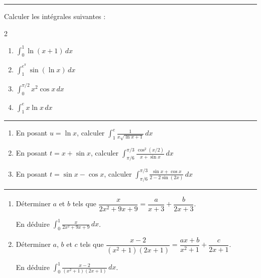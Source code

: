 \documentclass[../PolyS2.tex]{subfiles}
\begin{document}
\vspace{1em}\hrule\vspace{1em}

\newpage 


Calculer les intégrales suivantes :

\begin{multicols}{2}
\begin{enumerate}
\item $\displaystyle\int_0^1 \ln(x+1) \, dx$
\item $\displaystyle\int_1^{e^\pi} \sin(\ln x) \, dx$
\item $\displaystyle\int_0^{\pi/2} x^2 \cos x \, dx$
\item $\displaystyle\int_1^e x \ln x \, dx$
\end{enumerate}
\end{multicols}

\vspace{1em}\hrule\vspace{1em}


\begin{enumerate}
\item En posant $u = \ln x$, calculer $\displaystyle\int_1^e \frac{1}{x\sqrt{\ln x + 1}} \, dx$
\item En posant $t = x + \sin x$, calculer $\displaystyle\int_{\pi/6}^{\pi/3} \frac{\cos^2(x/2)}{x + \sin x} \, dx$
\item En posant $t = \sin x - \cos x$, calculer $\displaystyle\int_{\pi/6}^{\pi/3} \frac{\sin x + \cos x}{2 - 2\sin(2x)} \, dx$
\end{enumerate}

\vspace{1em}\hrule\vspace{1em}


\begin{enumerate}
\item Déterminer $a$ et $b$ tels que $\dfrac{x}{2x^2+9x+9} = \dfrac{a}{x+3} + \dfrac{b}{2x+3}$.

En déduire $\displaystyle\int_0^1 \frac{x}{2x^2+9x+9} \, dx$.

\item Déterminer $a$, $b$ et $c$ tels que $\dfrac{x-2}{(x^2+1)(2x+1)} = \dfrac{ax+b}{x^2+1} + \dfrac{c}{2x+1}$.

En déduire $\displaystyle\int_0^1 \frac{x-2}{(x^2+1)(2x+1)} \, dx$.
\end{enumerate}
\end{document}
